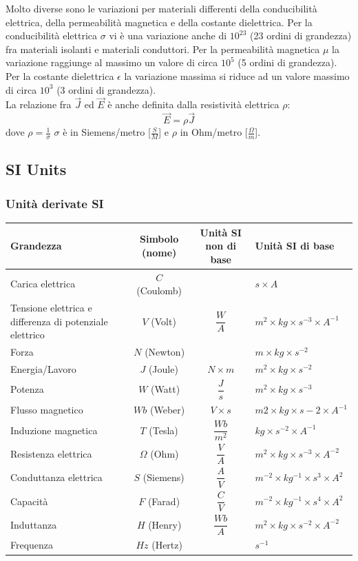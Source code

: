 \documentclass{article}
\begin{document}
Molto diverse sono le variazioni per materiali differenti della
conducibilità elettrica, della permeabilità magnetica e della costante
dielettrica.
Per la conducibilità elettrica $\sigma$ vi è una variazione anche di $10^{23}$ (23 ordini
di grandezza) fra materiali isolanti e materiali conduttori.
Per la permeabilità magnetica $\mu$ la variazione raggiunge al massimo un
valore di circa $10^5$ (5 ordini di grandezza).
Per la costante dielettrica $\epsilon$ la variazione massima si riduce ad un valore
massimo di circa $10^3$ (3 ordini di grandezza).
\vspace*{0.2cm}\\
La relazione fra $\vec J$ ed $\vec E$ è
anche definita dalla
resistività elettrica $\rho$:
\[
    \vec E = \rho \vec J
\]
dove
$\rho = \frac{1}{\sigma}$
$\sigma$ è in Siemens/metro [$\frac{S}{M}$] e $\rho$ in Ohm/metro [$\frac{\Omega}{m}$].


\subsection{SI Units}
\subsubsection{Unità derivate SI}

    \begin{tabular}{|m{35mm}|c|c|m{35mm}|}
    \hline
    Grandezza&
    Simbolo (nome)&
    Unità SI non di base&
    Unità SI di base\\
    \hline 
    Carica elettrica&
    $C$ (Coulomb)&
    & 
    $s \times A$\\
    \hline
    Tensione elettrica e differenza di potenziale elettrico &
    $V$ (Volt)&
    $ \dfrac{W}{A}$&
    $m^2 \times kg \times s^{-3} \times A^{-1}$\\
    \hline
    Forza&
 $N$ (Newton)&
 &
 $m \times kg \times s^{-2}$\\
 \hline
Energia/Lavoro&
 $J$ (Joule)&
 $N \times m$&
 $m^2 \times kg \times s^{-2}$\\
 \hline
Potenza&
 $W$ (Watt)&
 $\dfrac{J}{s}$&
 $m^2 \times kg \times s^{-3}$\\
 \hline 
Flusso magnetico&
 $Wb$ (Weber)&
 $V \times s$&
 $m2 \times kg \times s-2 \times A^{-1}$\\
 \hline 
Induzione magnetica&
 $T$ (Tesla)&
 $\dfrac{Wb}{m^2}$&
 $kg \times s^{-2} \times A^{-1}$\\
 \hline 
Resistenza elettrica&
 $\Omega$ (Ohm)&
 $\dfrac{V}{A}$&
 $m^2 \times kg \times s^{-3} \times A^{-2}$\\
 \hline 
Conduttanza elettrica&
 $S$ (Siemens)&
 $\dfrac{A}{V}$&
 $m^{-2} \times kg^{-1} \times s^3 \times A^2$\\
 \hline 
Capacità&
 $F$ (Farad)&
 $\dfrac{C}{V}$&
 $m^{-2} \times kg^{-1} \times s^4 \times A^2$\\
 \hline 
Induttanza&
 $H$ (Henry)&
 $\dfrac{Wb}{A}$&
 $m^2 \times kg \times s^{-2} \times A^{-2}$\\
 \hline
Frequenza&
 $Hz$ (Hertz)&
 &
 $s^{-1}$\\
 \hline 
\end{tabular}
\end{document}
